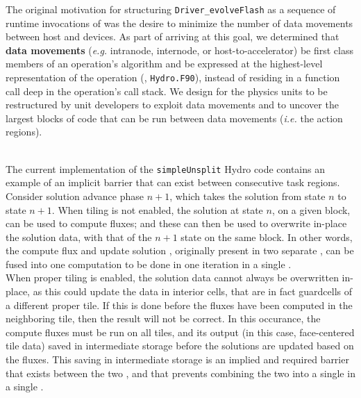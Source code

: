 \documentclass{article}
\begin{document}
The original motivation for structuring \texttt{Driver\_evolveFlash} as a
sequence of runtime invocations of \actionroutinebundles was the desire to minimize the
number of data movements between host and devices.  As part of arriving at this
goal, we determined that \textbf{data movements} (\textit{e.g.} intranode,
internode, or host-to-accelerator) be first class members of an
operation's algorithm and be expressed at the highest-level
representation of the operation (\eg, \texttt{Hydro.F90}), instead of
residing in a function call deep in the operation's call stack.  We design for the physics
 units to be restructured by unit developers to exploit data movements and to
 uncover the largest blocks of code that can be run between data
movements (\textit{i.e.} the action regions).

\\

The current implementation of the \texttt{simpleUnsplit} Hydro code contains
 an example of an implicit barrier that can exist between
consecutive task regions.
Consider solution advance phase $n+1$, which takes the solution from state $n$ to state $n+1$.
When tiling is not enabled, the solution at state $n$, on
a given block, can be used to compute fluxes; and these can then be used to overwrite in-place
the solution data, with that of the $n+1$ state on the same block.  In other
words, the compute flux and update solution \OLAR, originally present in
two separate \actionnests, can be fused into one
computation to be done in one iteration in a single \actionnest.\\

When proper tiling is enabled, the solution data cannot always be overwritten
in-place, as this could update the data in interior cells, that are in fact
guardcells of a different proper tile.  If this is done before the fluxes have been
computed in the neighboring tile, then the result will not be correct.
In this occurance, the compute fluxes \actionroutine must be run on all tiles, and
its output (in this case, face-centered tile data) saved in intermediate storage before
 the solutions are updated based on the fluxes.
This saving in intermediate storage is an implied and required barrier that exists between
the two \actionnests, and that prevents combining the two \OLARs into a single
\OLAR in a single \actionnest.\\

\end{document}
